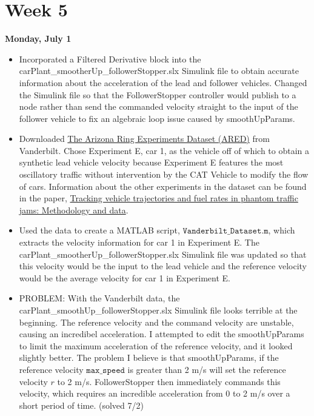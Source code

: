 \documentclass[12pt, letterpaper]{article}
\begin{document}
\pagebreak


\noindent \section*{Week 5}

{\bf Monday, July 1}
\begin{itemize}
\item Incorporated a Filtered Derivative block into the carPlant\_smootherUp\_followerStopper.slx Simulink file to obtain accurate information about the acceleration of the lead and follower vehicles. Changed the Simulink file so that the FollowerStopper controller would publish to a node rather than send the commanded velocity straight to the input of the follower vehicle to fix an algebraic loop issue caused by smoothUpParams.
\item Downloaded \href{https://ir.vanderbilt.edu/handle/1803/9358}{\color{blue} The Arizona Ring Experiments Dataset (ARED)} from Vanderbilt. Chose Experiment E, car 1, as the vehicle off of which to obtain a synthetic lead vehicle velocity because Experiment E features the most oscillatory traffic without intervention by the CAT Vehicle to modify the flow of cars. Information about the other experiments in the dataset can be found in the paper, \href{https://www.sciencedirect.com/science/article/pii/S0968090X18318345}{\color{blue} Tracking vehicle trajectories and fuel rates in phantom traffic jams: Methodology and data}.
\item Used the data to create a MATLAB script, $\mathtt{Vanderbilt\_Dataset.m}$, which extracts the velocity information for car 1 in Experiment E. The carPlant\_smootherUp\_followerStopper.slx Simulink file was updated so that this velocity would be the input to the lead vehicle and the reference velocity would be the average velocity for car 1 in Experiment E.
\item PROBLEM: With the Vanderbilt data, the carPlant\_smoothUp\_followerStopper.slx Simulink file looks terrible at the beginning. The reference velocity and the command velocity are unstable, causing an incredibel acceleration. I attempted to edit the smoothUpParams to limit the maximum acceleration of the reference velocity, and it looked slightly better. The problem I believe is that smoothUpParams, if the reference velocity $\mathtt{max\_speed}$ is greater than 2 m/s will set the reference velocity $r$ to 2 m/s. FollowerStopper then immediately commands this velocity, which requires an incredible acceleration from 0 to 2 m/s over a short period of time. (solved 7/2)
\end{itemize}
\end{document}
